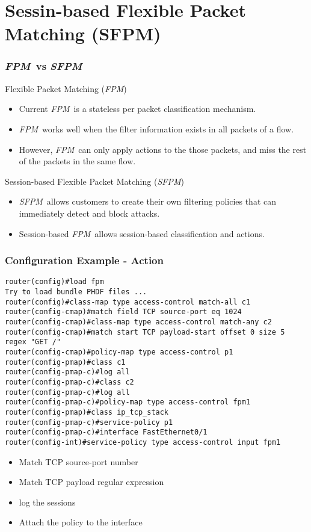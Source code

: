\documentclass{beamer}
\newcommand{\fpm}{\emph{FPM}}
\newcommand{\sfpm}{\emph{SFPM}}
\begin{document}
\section{Sessin-based Flexible Packet Matching (SFPM)}
\begin{frame}[fragile] \frametitle{\fpm~vs \sfpm}
    \begin{block}{Flexible Packet Matching (\fpm)}
        \begin{itemize}
            \item Current \fpm~is a stateless per packet classification mechanism.
            \item \fpm~works well when the filter information exists in all packets of a flow.
            \item However, \fpm~can only apply actions to the those packets, and miss the rest of the packets in the same flow.
        \end{itemize}
    \end{block}

    \begin{block}{Session-based Flexible Packet Matching (\sfpm)}
        \begin{itemize}
            \item \sfpm~allows customers to create their own filtering policies that can immediately detect and block attacks.
            \item Session-based \fpm~allows session-based classification and actions.
        \end{itemize}
    \end{block}
\end{frame}

\begin{frame}[fragile] \frametitle{Configuration Example - Action}
\begin{lstlisting}[language=Terminal]
router(config)#load fpm
Try to load bundle PHDF files ...
router(config)#class-map type access-control match-all c1
router(config-cmap)#match field TCP source-port eq 1024
router(config-cmap)#class-map type access-control match-any c2
router(config-cmap)#match start TCP payload-start offset 0 size 5 regex "GET /"
router(config-cmap)#policy-map type access-control p1
router(config-pmap)#class c1
router(config-pmap-c)#log all
router(config-pmap-c)#class c2
router(config-pmap-c)#log all
router(config-pmap-c)#policy-map type access-control fpm1
router(config-pmap)#class ip_tcp_stack
router(config-pmap-c)#service-policy p1
router(config-pmap-c)#interface FastEthernet0/1
router(config-int)#service-policy type access-control input fpm1
\end{lstlisting}
\begin{block}{}
\begin{itemize}
	\item Match TCP source-port number
    \item Match TCP payload regular expression
	\item log the sessions
	\item Attach the policy to the interface
\end{itemize}
\end{block}
\end{frame}
\end{document}
